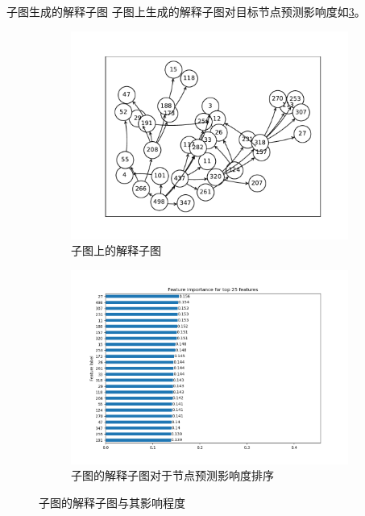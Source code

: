 \documentclass[UTF8, aspectratio=169,10pt]{beamer}%
\numberwithin{equation}{section}
\numberwithin{figure}{section}
\numberwithin{table}{section}
\theoremstyle{definition}
\begin{document}
\begin{frame}{子图生成的解释子图}
	子图上生成的解释子图对目标节点预测影响度如\cref{fig:cc22}。
	\begin{figure}[h]
		\centering
		\begin{subfigure}[b]{0.40\textwidth}
			\centering
			\includegraphics[width=\textwidth]{pic/q1}
			\caption{子图上的解释子图}
			\label{fig:1111}
		\end{subfigure}
		\hfill
		\begin{subfigure}[b]{0.40\textwidth}
			\centering
			\includegraphics[width=\textwidth]{pic/q2}
			\caption{子图的解释子图对于节点预测影响度排序}
			\label{fig:2222}
		\end{subfigure}
		\caption{子图的解释子图与其影响程度}
		\label{fig:cc22}
	\end{figure}
	
	
	
\end{frame}
\end{document}
